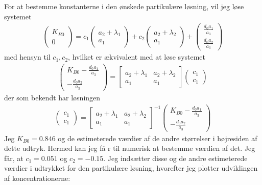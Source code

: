 \documentclass[12pt]{article}
\begin{document}
For at bestemme konstanterne i den ønskede partikulære løsning, vil jeg løse systemet
\begin{align}
\begin{pmatrix}
K_{B0} \\ 0
\end{pmatrix} =   
c_1\begin{pmatrix}
a_2 + \lambda_1\\
a_1
\end{pmatrix}  + c_2\begin{pmatrix}
a_2 + \lambda_2\\
a_1
\end{pmatrix} + \begin{pmatrix}
\frac{d_0a_1}{a_3} \\ 
\frac{d_0a_2}{a_3}
\end{pmatrix}
\end{align}
med hensyn til $c_1, c_2$, hvilket er ækvivalent med at løse systemet
\begin{align}
\begin{pmatrix}
K_{B0} - \frac{d_0a_1}{a_3} \\ - \frac{d_0a_2}{a_3}
\end{pmatrix} =  
\begin{bmatrix}
a_2 + \lambda_1 & a_2 + \lambda_2\\
a_1 & a_1
\end{bmatrix}
\begin{pmatrix}
c_1 \\ c_1
\end{pmatrix} 
\end{align}
der som bekendt har løsningen
\begin{align} 
\begin{pmatrix}
c_1 \\ c_1
\end{pmatrix} =
\begin{bmatrix}
a_2 + \lambda_1 & a_2 + \lambda_2\\
a_1 & a_1
\end{bmatrix}^{-1}
\begin{pmatrix}
K_{B0} - \frac{d_0a_1}{a_3} \\ - \frac{d_0a_2}{a_3}
\end{pmatrix} 
\end{align}
Jeg $K_{B0}=0.846$ og de estimeterede værdier af de andre størrelser i højresiden af dette udtryk. Hermed kan jeg få r til numerisk at bestemme værdien af det. Jeg får, at $c_1=0.051$ og $c_2=-0.15$. Jeg indsætter disse og de andre estimeterede værdier i udtrykket for den partikulære løsning, hvorefter jeg plotter udviklingen af koncentrationerne:
\end{document}
